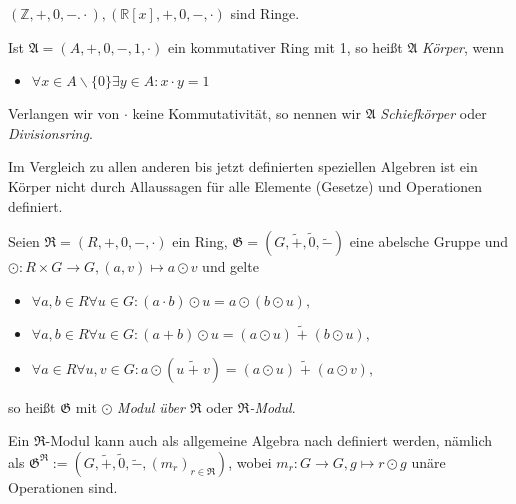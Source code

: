 \begin{example}
    $(\mathbb{Z}, +, 0, -. \cdot), (\mathbb{R}[x], +, 0, -, \cdot)$ sind Ringe.
\end{example}

\begin{samepage}
\begin{definition}
    Ist $\mathfrak{A} = (A,+,0,-,1,\cdot)$ ein kommutativer Ring mit 1, so heißt $\mathfrak{A}$ \emph{Körper}, wenn
    \begin{itemize}
        \item $\forall x \in A\backslash \{0\} \exists y \in A: x\cdot y = 1$
    \end{itemize}
    Verlangen wir von $\cdot$ keine Kommutativität, so nennen wir $\mathfrak{A}$ \emph{Schiefkörper} oder \emph{Divisionsring}.
\end{definition}
\end{samepage}

\begin{remark}
    Im Vergleich zu allen anderen bis jetzt definierten speziellen Algebren ist ein Körper nicht durch Allaussagen für alle Elemente (Gesetze) und Operationen definiert. 
\end{remark}

\begin{definition}
    Seien $\mathfrak{R} = (R, +, 0, -, \cdot)$ ein Ring, $\mathfrak{G} = (G, \widetilde{+}, \widetilde{0}, \widetilde{-})$ eine abelsche Gruppe und $\odot: R \times G \to G, (a, v) \mapsto a \odot v$ und gelte
    \begin{itemize}
        \item $\forall a,b \in R \forall u \in G: (a \cdot b)\odot u = a \odot (b \odot u),$
        \item $\forall a,b \in R \forall u \in G: (a + b) \odot u = (a \odot u) \;\widetilde{+}\; (b \odot u),$
        \item $\forall a \in R \forall u,v \in G: a \odot (u \;\widetilde{+}\; v) = (a \odot u) \;\widetilde{+}\; (a \odot v),$
    \end{itemize}
    so heißt $\mathfrak{G}$ mit $\odot$ \emph{Modul über $\mathfrak{R}$} oder \emph{$\mathfrak{R}$-Modul}.

    Ein $\mathfrak{R}$-Modul kann auch als allgemeine Algebra nach  definiert werden, nämlich als $\mathfrak{G}^\mathfrak{R} := (G, \widetilde{+}, \widetilde{0}, \widetilde{-}, (m_r)_{r \in \mathfrak{R}})$, wobei $m_r: G \to G, g \mapsto r \odot g$ unäre Operationen sind.
\end{definition}

